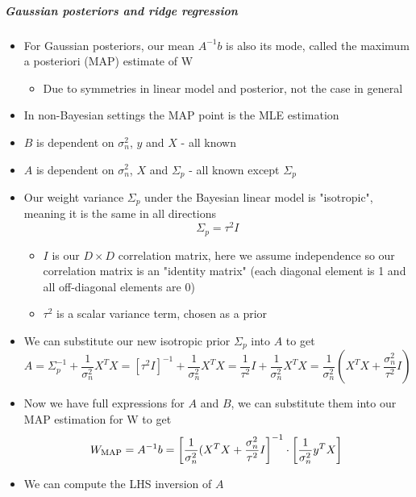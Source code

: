 \documentclass[12pt]{article}
\begin{document}
\subparagraph{Gaussian posteriors and ridge regression}
\begin{itemize}
    \item For Gaussian posteriors, our mean $A^{-1}b$ is also its mode, called the maximum a posteriori (MAP) estimate of W
        \begin{itemize}
            \item Due to symmetries in linear model and posterior, not the case in general
        \end{itemize}
    \item In non-Bayesian settings the MAP point is the MLE estimation
    \item $B$ is dependent on $\sigma_n^2$, $y$ and $X$ - all known
    \item $A$ is dependent on $\sigma_n^2$, $X$ and $\Sigma_p$ - all known except $\Sigma_p$
    \item Our weight variance $\Sigma_p$ under the Bayesian linear model is "isotropic", meaning it is the same in all directions
\begin{equation}
    \Sigma_p = \tau^2 I
\end{equation}
    \begin{itemize}
        \item $I$ is our $D \times D$ correlation matrix, here we assume independence so our correlation matrix is an "identity matrix" (each diagonal element is 1 and all off-diagonal elements are 0)
        \item $\tau^2$ is a scalar variance term, chosen as a prior
    \end{itemize}
    \item We can substitute our new isotropic prior $\Sigma_p$ into $A$ to get
\begin{equation} 
    A = \Sigma_p^{-1} + \frac{1}{\sigma^2_n}X^TX = \left[{\tau^2}I\right]^{-1} + \frac{1}{\sigma^2_n}X^TX =  \frac{1}{\tau^2}I + \frac{1}{\sigma^2_n}X^TX = \frac{1}{\sigma_n^2}\left(X^TX + \frac{\sigma_n^2}{\tau^2}I\right)
\end{equation} 
    \item Now we have full expressions for $A$ and $B$, we can substitute them into our MAP estimation for W to get
\begin{equation} 
    W_{\text{MAP}} = A^{-1}b = \left[\frac{1}{\sigma_n^2}(X^TX + \frac{\sigma_n^2}{\tau^2}I\right]^{-1} \cdot \left[\frac{1}{\sigma_n^2}y^TX\right] \\
\end{equation}
    \item We can compute the LHS inversion of $A$

\end{itemize}
\end{document}
